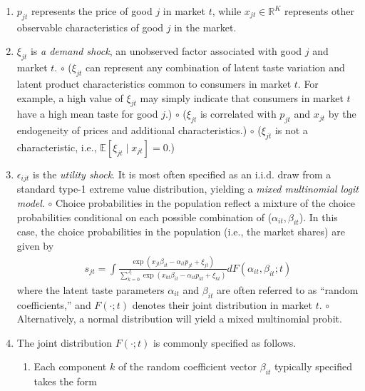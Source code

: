 \documentclass[11pt]{elegantbook}
\begin{document}
\begin{enumerate}
    \item $p_{jt}$ represents the price of good $j$ in market $t$, while $x_{jt}\in \mathbb{R}^K$ represents other observable characteristics of good $j$ in the market.
    \item $\xi_{jt}$ is \textit{ a demand shock}, an unobserved factor associated with good $j$ and market $t$.
    \subitem $\circ$ ($\xi_{jt}$ can represent any combination of latent taste variation and latent product characteristics common to consumers in market $t$. For example, a high value of $\xi_{jt}$ may simply indicate that consumers in market $t$ have a high mean taste for good $j$.)
    \subitem $\circ$ ($\xi_{jt}$ is correlated with $p_{jt}$ and $x_{jt}$ by the endogeneity of prices and additional characteristics.)
    \subitem $\circ$ ($\xi_{jt}$ is not a characteristic, i.e., $\mathbb{E}[\xi_{jt}\mid x_{jt}]=0$.)
    \item $\epsilon_{ijt}$ is the \textit{utility shock}. It is most often specified as an i.i.d. draw from a standard type-1 extreme value distribution, yielding a \textit{mixed multinomial logit model}.
    \subitem $\circ$ Choice probabilities in the population reflect a mixture of the choice probabilities conditional on each possible combination of ($\alpha_{it},\beta_{it}$). In this case, the choice probabilities in the population (i.e., the market shares) are given by
    \begin{equation}
        \begin{aligned}
            s_{jt}=\int \frac{\exp(x_{jt}\beta_{it}-\alpha_{it}p_{jt}+\xi_{jt})}{\sum_{k=0}^{J_t}\exp(x_{kt}\beta_{it}-\alpha_{it}p_{kt}+\xi_{kt})}d F(\alpha_{it},\beta_{it};t)
        \end{aligned}
        \label{eq:mixed_multinomial_logit}
    \end{equation}
    where the latent taste parameters $\alpha_{it}$ and $\beta_{it}$ are often referred to as ``random coefficients,'' and $F(\cdot;t)$ denotes their joint distribution in market $t$.
    \subitem $\circ$ Alternatively, a normal distribution will yield a mixed multinomial probit.
    \item The joint distribution $F(\cdot;t)$ is commonly specified as follows.
    \begin{enumerate}
        \item Each component $k$ of the random coefficient vector $\beta_{it}$ typically specified takes the form
        \begin{equation}

\end{equation}
\end{enumerate}
\end{enumerate}
\end{document}
